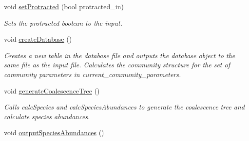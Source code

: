 \begin{DoxyCompactItemize}
\item 
void \hyperlink{class_community_a649afbf07398a1717ad49cb22bb744ff}{set\+Protracted} (bool protracted\+\_\+in)
\begin{DoxyCompactList}\small\item\em Sets the protracted boolean to the input. \end{DoxyCompactList}\item 
void \hyperlink{class_community_ad6e92dafaf00fd65cc29ca436dc61a2e}{create\+Database} ()
\begin{DoxyCompactList}\small\item\em Creates a new table in the database file and outputs the database object to the same file as the input file. Calculates the community structure for the set of community parameters in current\+\_\+community\+\_\+parameters. \end{DoxyCompactList}\item 
void \hyperlink{class_community_a078a9a1210d6b7e8f6f378891f7e8b86}{generate\+Coalescence\+Tree} ()\hypertarget{class_community_a078a9a1210d6b7e8f6f378891f7e8b86}{}\label{class_community_a078a9a1210d6b7e8f6f378891f7e8b86}

\begin{DoxyCompactList}\small\item\em Calls calc\+Species and calc\+Species\+Abundances to generate the coalescence tree and calculate species abundances. \end{DoxyCompactList}\item 
void \hyperlink{class_community_a8cb8044c6b2e290e7933cbc78d7019be}{output\+Species\+Abundances} ()\hypertarget{class_community_a8cb8044c6b2e290e7933cbc78d7019be}{}\label{class_community_a8cb8044c6b2e290e7933cbc78d7019be}


\end{DoxyCompactItemize}
